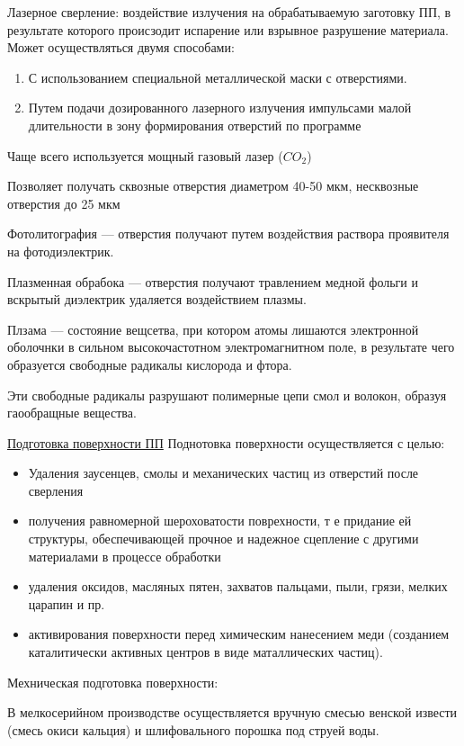\documentclass{article}
\begin{document}
Лазерное сверление: воздействие излучения на обрабатываемую заготовку ПП, в результате которого происзодит испарение или взрывное разрушение материала. Может осуществляться двумя способами:
\begin{enumerate}
	\item С использованием специальной металлической маски с отверстиями.
	\item Путем подачи дозированного лазерного излучения импульсами малой длительности в зону формирования отверстий по программе
\end{enumerate}

Чаще всего используется мощный газовый лазер ($C O_2$)

Позволяет получать сквозные отверстия диаметром 40-50 мкм, несквозные отверстия до 25 мкм

Фотолитография --- отверстия получают путем воздействия раствора проявителя на фотодиэлектрик.

Плазменная обрабока --- отверстия получают травлением медной фольги и вскрытый диэлектрик удаляется воздействием плазмы.

Плзама --- состояние вещсетва, при котором атомы лишаются электронной оболочнки в сильном высокочастотном электромагнитном поле, в результате чего образуется свободные радикалы кислорода и фтора.

Эти свободные радикалы разрушают полимерные цепи смол и волокон, образуя гаообращные вещества.

\underline{Подготовка поверхности ПП} 
Поднотовка поверхности осуществляется с целью:
\begin{itemize}
	\item Удаления заусенцев, смолы и механических частиц из отверстий после сверления
	\item получения равномерной шероховатости поврехности, т е придание ей структуры, обеспечивающей прочное и надежное сцепление с другими материалами в процессе обработки
	\item удаления оксидов, масляных пятен, захватов пальцами, пыли, грязи, мелких царапин и пр.
	\item активирования поверхности перед химическим нанесением меди (созданием каталитически активных центров в виде маталлических частиц).
\end{itemize}

Мехническая подготовка поверхности:

В мелкосерийном производстве осуществляется вручную смесью венской извести (смесь окиси кальция) и шлифовального порошка под струей воды.
\end{document}
